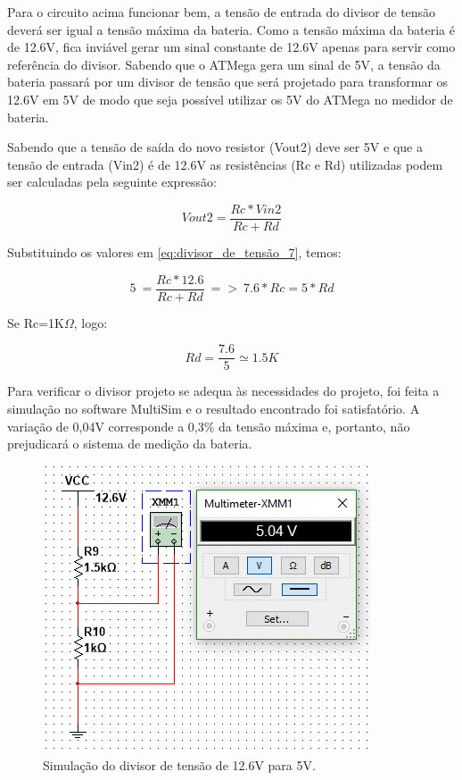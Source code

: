 		Para o circuito acima funcionar bem, a tensão de entrada do divisor de tensão deverá ser igual a tensão máxima da bateria. Como a tensão máxima da bateria é de 12.6V, fica inviável gerar um sinal constante de 12.6V apenas para servir como referência do divisor. Sabendo que o ATMega gera um sinal de 5V, a tensão da bateria passará por um divisor de tensão  que será projetado para transformar os 12.6V em 5V de modo que seja possível utilizar os 5V do ATMega no medidor de bateria.

		Sabendo que a tensão de saída do novo resistor (Vout2) deve ser 5V e que a tensão de entrada (Vin2) é de 12.6V as resistências (Rc e Rd) utilizadas podem ser calculadas pela seguinte expressão:

		\begin{equation}
		\label{eq:divisor_de_tensão_7}
			Vout2 =\frac{Rc * Vin2}{Rc + Rd}
		\end{equation}

		Substituindo os valores em \ref{eq:divisor_de_tensão_7}, temos:

		\begin{equation}
		\label{eq:divisor_de_tensão_8}
			5\ =\frac{Rc * 12.6}{Rc + Rd}\ =>\ 7.6 * Rc = 5 *Rd
		\end{equation}

		Se Rc=1K$\Omega$, logo:

		\begin{equation}
		\label{eq:divisor_de_tensão_9}
			Rd =\frac{7.6}{5} \simeq 1.5K
		\end{equation}

		Para verificar o divisor projeto se adequa às necessidades do projeto, foi feita a simulação no software MultiSim e o resultado encontrado foi satisfatório. A variação de 0,04V corresponde a 0,3\% da tensão máxima e, portanto, não prejudicará o sistema de medição da bateria.

		\begin{figure}[H]
			\centering
			\includegraphics[scale=0.8]{figuras/Divisor2_simu.png}
			\caption{Simulação do divisor de tensão de 12.6V para 5V.}
			\label{img:divisor_de_tesnão_simulado}
		\end{figure}

